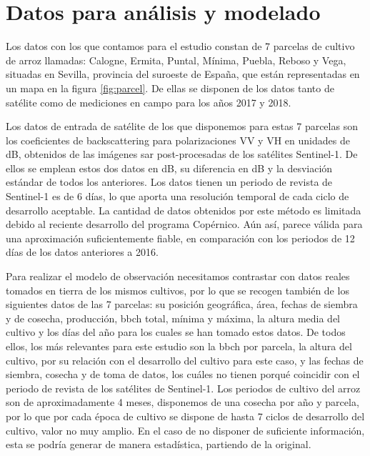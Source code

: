 \section{Datos para análisis y modelado}
\par Los datos con los que contamos para el estudio constan de 7 parcelas de cultivo de arroz llamadas: Calogne, Ermita, Puntal, Mínima, Puebla, Reboso y Vega, situadas en Sevilla, provincia del suroeste de España, que están representadas en un mapa en la figura \ref{fig:parcel}. De ellas se disponen de los datos tanto de satélite como de mediciones en campo para los años 2017 y 2018. 
\\
\par Los datos de entrada de satélite de los que disponemos para estas 7 parcelas son los coeficientes de backscattering para polarizaciones VV y VH en unidades de dB, obtenidos de las imágenes \gls{sar} post-procesadas de los satélites Sentinel-1. De ellos se emplean estos dos datos en dB, su diferencia en dB y la desviación estándar de todos los anteriores. Los datos tienen un periodo de revista de Sentinel-1 es de 6 días, lo que aporta una resolución temporal de cada ciclo de desarrollo aceptable. La cantidad de datos obtenidos por este método es limitada debido al reciente desarrollo del programa Copérnico. Aún así, parece válida para una aproximación suficientemente fiable, en comparación con los periodos de 12 días de los datos anteriores a 2016.
\\
\par Para realizar el modelo de observación necesitamos contrastar con datos reales tomados en tierra de los mismos cultivos, por lo que se recogen también de los siguientes datos de las 7 parcelas: su posición geográfica, área, fechas de siembra y de cosecha, producción, \gls{bbch} total, mínima y máxima, la altura media del cultivo y los días del año para los cuales se han tomado estos datos. De todos ellos, los más relevantes para este estudio son la \gls{bbch} por parcela, la altura del cultivo, por su relación con el desarrollo del cultivo para este caso, y las fechas de siembra, cosecha y de toma de datos, los cuáles no tienen porqué coincidir con el periodo de revista de los satélites de Sentinel-1.  Los periodos de cultivo del arroz son de aproximadamente 4 meses, disponemos de una cosecha por año y parcela, por lo que por cada época de cultivo se dispone de hasta 7 ciclos de desarrollo del cultivo, valor no muy amplio. En el caso de no disponer de suficiente información, esta se podría generar de manera estadística, partiendo de la original. 
